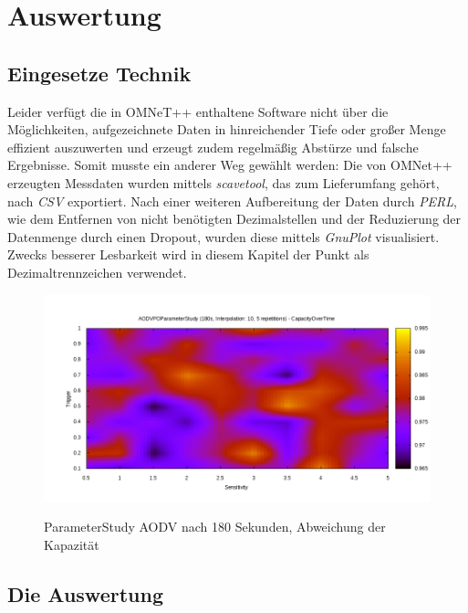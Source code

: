 
\chapter{Auswertung}
\label{chapter:auswertung}

\section{Eingesetze Technik}
\label{chapter:auswertung:technik}

Leider verfügt die in OMNeT++ enthaltene Software nicht über die Möglichkeiten, aufgezeichnete Daten in hinreichender Tiefe oder großer Menge effizient auszuwerten und erzeugt zudem regelmäßig Abstürze und falsche Ergebnisse. Somit musste ein anderer Weg gewählt werden: Die von OMNet++ erzeugten Messdaten wurden mittels \textit{scavetool}, das zum Lieferumfang gehört, nach \textit{CSV} exportiert. Nach einer weiteren Aufbereitung der Daten durch \textit{PERL}, wie dem Entfernen von nicht benötigten Dezimalstellen und der Reduzierung der Datenmenge durch einen Dropout, wurden diese mittels \textit{GnuPlot} visualisiert. Zwecks besserer Lesbarkeit wird in diesem Kapitel der Punkt als Dezimaltrennzeichen verwendet.

\begin{figure}
  \centering
  \includegraphics[scale=0.45]{bilder/aps1.png} \\
  \caption{ParameterStudy AODV nach 180 Sekunden, Abweichung der Kapazität}
  \label{image:omnet:aodv:one}
\end{figure}

\section{Die Auswertung}
\label{chapter:auswertung:versuche}

